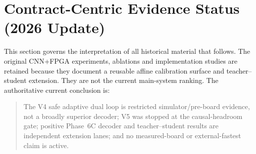 \documentclass[11pt]{article}
\begin{document}
\section{Contract-Centric Evidence Status (2026 Update)}

This section governs the interpretation of all historical material that follows.
The original CNN+FPGA experiments, ablations and implementation studies are
retained because they document a reusable affine calibration surface and
teacher--student extension.  They are not the current main-system ranking.  The
authoritative current conclusion is:

\begin{quote}
The V4 safe adaptive dual loop is restricted simulator/pre-board evidence, not
a broadly superior decoder; V5 was stopped at the causal-headroom gate; positive
Phase~6C decoder and teacher--student results are independent extension lanes;
and no measured-board or external-fastest claim is active.
\end{quote}
\end{document}
